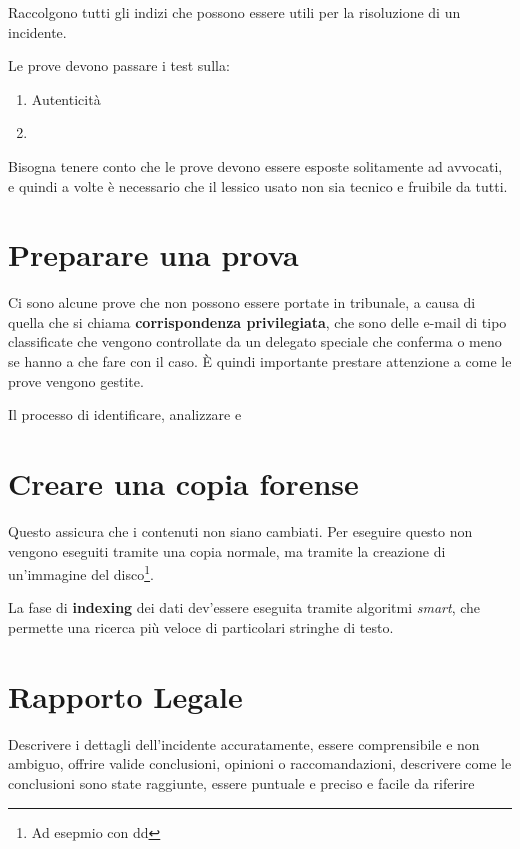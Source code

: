 Raccolgono tutti gli indizi che possono essere utili per la risoluzione di un 
incidente.

Le prove devono passare i test sulla:
\begin{enumerate}
\item Autenticità
\item {}
\end{enumerate}

Bisogna tenere conto che le prove devono essere esposte solitamente ad avvocati, 
e quindi a volte è necessario che il lessico usato non sia tecnico e fruibile da 
tutti.

\section{Preparare una prova}

Ci sono alcune prove che non possono essere portate in tribunale, a causa di 
quella che si chiama \textbf{corrispondenza privilegiata}, che sono delle e-mail 
di tipo classificate che vengono controllate da un delegato speciale che 
conferma o meno se hanno a che fare con il caso. È quindi importante prestare 
attenzione a come le prove vengono gestite.


Il processo di identificare, analizzare e 

\section{Creare una copia forense}

Questo assicura che i contenuti non siano cambiati. Per eseguire questo non 
vengono eseguiti tramite una copia normale, ma tramite la creazione di 
un'immagine del disco\footnote{Ad esepmio con dd}.

La fase di \textbf{indexing} dei dati dev'essere eseguita tramite algoritmi 
\textit{smart}, che permette una ricerca più veloce di particolari stringhe di 
testo.

\section{Rapporto Legale}

Descrivere i dettagli dell'incidente accuratamente, essere comprensibile e non 
ambiguo, offrire valide conclusioni, opinioni o raccomandazioni, descrivere come 
le conclusioni sono state raggiunte, essere puntuale e preciso e facile da 
riferire



